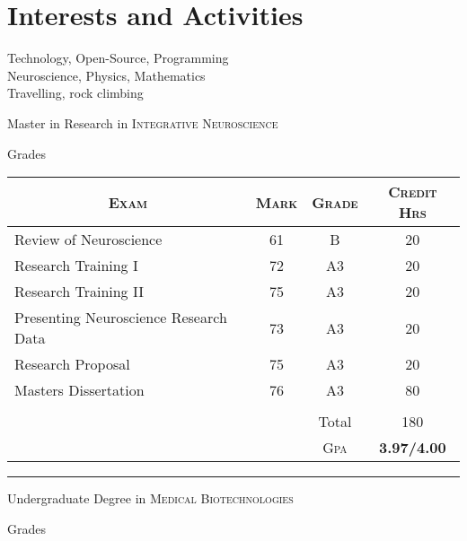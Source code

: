\documentclass[a4paper,10pt]{article}
\begin{document}
\section{Interests and Activities}
Technology, Open-Source, Programming\\
Neuroscience, Physics, Mathematics\\
Travelling, rock climbing



\newpage
\par{\centering\Large \hypertarget{grds}{Master in Research in \textsc{Integrative Neuroscience}}\par}\large{\centering Grades\par}\normalsize
\begin{center}
\begin{tabular}{lccc}
\multicolumn{1}{c}{\textsc{Exam}}&\textsc{Mark}&\textsc{Grade}&\textsc{Credit Hrs}\\ \hline
    Review of Neuroscience	&61 &B &20\\
    Research Training I	    &72 &A3 &20\\
    Research Training II	&75 &A3 &20\\
    Presenting Neuroscience Research Data	&73 &A3 &20\\
    Research Proposal	    &75 &A3 &20\\
    Masters Dissertation	&76 &A3 &80\\
    & & & & \\
		& & Total&180\\\cline{3-4}
        & & \textsc{Gpa}&\textbf{3.97/4.00}
\end{tabular}
\end{center}
\bigskip
\hrule
\bigskip
\bigskip
\bigskip
\par{\centering\Large \hypertarget{grds_cleli}{Undergraduate Degree in \textsc{Medical Biotechnologies}}\par}\large{\centering Grades\par}\normalsize
\end{document}
